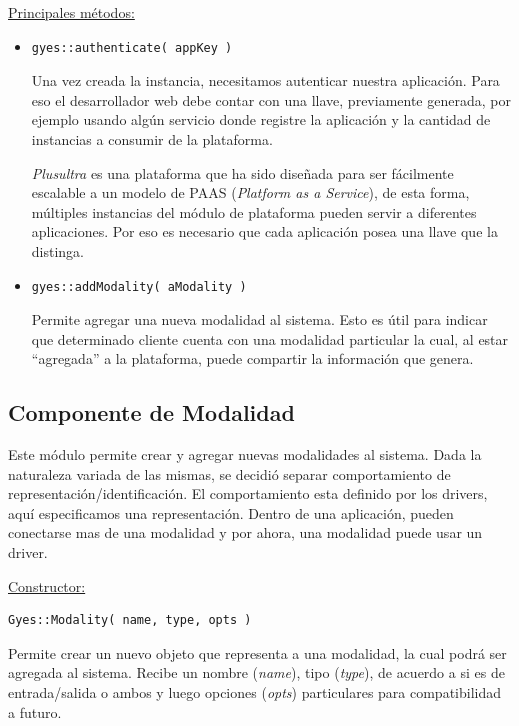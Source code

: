 \underline{\textsf{Principales métodos:}}
\begin{itemize}
\item[]
\begin{lstlisting}
gyes::authenticate( appKey )
\end{lstlisting}
Una vez creada la instancia, necesitamos autenticar nuestra aplicación. Para eso el desarrollador web debe contar con una llave, previamente generada, por ejemplo usando algún servicio donde registre la aplicación y la cantidad de instancias a consumir de la plataforma.

\emph{Plusultra} es una plataforma que ha sido diseñada para ser fácilmente escalable a un modelo de PAAS (\emph{Platform as a Service}), de esta forma, múltiples instancias del módulo de plataforma pueden servir a diferentes aplicaciones. Por eso es necesario que cada aplicación posea una llave que la distinga.

\item[]
\begin{lstlisting}
gyes::addModality( aModality )
\end{lstlisting}
Permite agregar una nueva modalidad al sistema. Esto es útil para indicar que determinado cliente cuenta con una modalidad particular la cual, al estar ``agregada'' a la plataforma, puede compartir la información que genera.
\end{itemize}

\subsection{Componente de Modalidad}

Este módulo permite crear y agregar nuevas modalidades al sistema. Dada la naturaleza variada de las mismas, se decidió separar comportamiento de representación/identificación. El comportamiento esta definido por los drivers, aquí especificamos una representación. Dentro de una aplicación, pueden conectarse mas de una modalidad y por ahora, una modalidad puede usar un driver.


\underline{\textsf{Constructor:}}
\begin{lstlisting}
Gyes::Modality( name, type, opts )
\end{lstlisting}
Permite crear un nuevo objeto que representa a una modalidad, la cual podrá ser agregada al sistema. Recibe un nombre (\emph{name}), tipo (\emph{type}), de acuerdo a si es de entrada/salida o ambos y luego opciones (\emph{opts}) particulares para compatibilidad a futuro.


